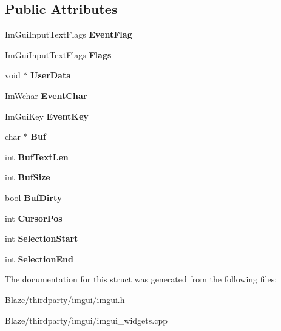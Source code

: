 \subsection*{Public Attributes}
\begin{DoxyCompactItemize}
\item 
\mbox{\label{structImGuiInputTextCallbackData_a6ad2f8e385c68e56e6682fc0c4e79949}} 
Im\+Gui\+Input\+Text\+Flags {\bfseries Event\+Flag}
\item 
\mbox{\label{structImGuiInputTextCallbackData_aac3133cf2c9d194142481e54192d8fa1}} 
Im\+Gui\+Input\+Text\+Flags {\bfseries Flags}
\item 
\mbox{\label{structImGuiInputTextCallbackData_ae8358ea4135032204fcba6c9ada7c49f}} 
void $\ast$ {\bfseries User\+Data}
\item 
\mbox{\label{structImGuiInputTextCallbackData_a7a6e9a43c5db8f236cde912b913fe707}} 
Im\+Wchar {\bfseries Event\+Char}
\item 
\mbox{\label{structImGuiInputTextCallbackData_a2db52e1da5e8109d4eeb5b0ab22200a9}} 
Im\+Gui\+Key {\bfseries Event\+Key}
\item 
\mbox{\label{structImGuiInputTextCallbackData_ac8cd46c3473851c2822aae8240289069}} 
char $\ast$ {\bfseries Buf}
\item 
\mbox{\label{structImGuiInputTextCallbackData_aa4db7629a772cfc3286a5a3fd1e5f1ab}} 
int {\bfseries Buf\+Text\+Len}
\item 
\mbox{\label{structImGuiInputTextCallbackData_a0e391986e9359f6777ab27a3b08229a6}} 
int {\bfseries Buf\+Size}
\item 
\mbox{\label{structImGuiInputTextCallbackData_aa2d91cca2b46de3f2b218573579f122b}} 
bool {\bfseries Buf\+Dirty}
\item 
\mbox{\label{structImGuiInputTextCallbackData_a45b3cc4d7625b1bc38d5b995ca149b43}} 
int {\bfseries Cursor\+Pos}
\item 
\mbox{\label{structImGuiInputTextCallbackData_a72642ac2ce877eaade95386cad70ee8a}} 
int {\bfseries Selection\+Start}
\item 
\mbox{\label{structImGuiInputTextCallbackData_a616bf3a1f0c2d73b9133931f22ab44a7}} 
int {\bfseries Selection\+End}
\end{DoxyCompactItemize}


The documentation for this struct was generated from the following files\+:\begin{DoxyCompactItemize}
\item 
Blaze/thirdparty/imgui/imgui.\+h\item 
Blaze/thirdparty/imgui/imgui\+\_\+widgets.\+cpp\end{DoxyCompactItemize}
